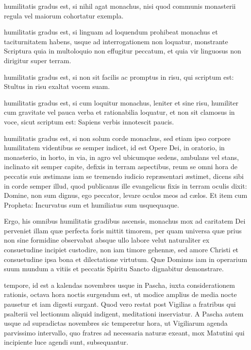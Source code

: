 \documentclass[fontsize=9pt,paper=A6,twoside,BCOR=1mm,DIV=22,headinclude]{scrarticle}
\begin{document}
\begin{multicols}{2}
 humilitatis gradus est, si nihil agat monachus, nisi quod communis monasterii regula vel maiorum cohortatur exempla.

 humilitatis gradus est, si linguam ad loquendum prohibeat monachus et taciturnitatem habens, usque ad interrogationem non loquatur, monstrante Scriptura quia in multoloquio non effugitur peccatum, et quia vir linguosus non dirigitur super terram.

 humilitatis gradus est, si non sit facilis ac promptus in risu, qui scriptum est: Stultus in risu exaltat vocem suam.

 humilitatis gradus est, si cum loquitur monachus, leniter et sine risu, humiliter cum gravitate vel pauca verba et rationabilia loquatur, et non sit clamosus in voce, sicut scriptum est: Sapiens verbis innotescit paucis.

 humilitatis gradus est, si non solum corde monachus, sed etiam ipso corpore humilitatem videntibus se semper indicet, id est Opere Dei, in oratorio, in monasterio, in horto, in via, in agro vel ubicumque sedens, ambulans vel stans, inclinato sit semper capite, defixis in terram aspectibus, reum se omni hora de peccatis suis æstimans iam se tremendo iudicio repræsentari æstimet, dicens sibi in corde semper illud, quod publicanus ille evangelicus fixis in terram oculis dixit: Domine, non sum dignus, ego peccator, levare oculos meos ad cælos. Et item cum Propheta: Incurvatus sum et humiliatus sum usquequaque.

Ergo, his omnibus humilitatis gradibus ascensis, monachus mox ad caritatem Dei perveniet illam quæ perfecta foris mittit timorem, per quam universa quæ prius non sine formidine observabat absque ullo labore velut naturaliter ex consuetudine incipiet custodire, non iam timore gehennæ, sed amore Christi et consuetudine ipsa bona et dilectatione virtutum. Quæ Dominus iam in operarium suum mundum a vitiis et peccatis Spiritu Sancto dignabitur demonstrare. 

 tempore, id est a kalendas novembres usque in Pascha, iuxta considerationem rationis, octava hora noctis surgendum est, ut modice amplius de media nocte pausetur et iam digesti surgant. Quod vero restat post Vigilias a fratribus qui psalterii vel lectionum aliquid indigent, meditationi inserviatur. A Pascha autem usque ad supradictas novembres sic temperetur hora, ut Vigiliarum agenda parvissimo intervallo, quo fratres ad necessaria naturæ exeant, mox Matutini qui incipiente luce agendi sunt, subsequantur. 


\end{multicols}
\end{document}
